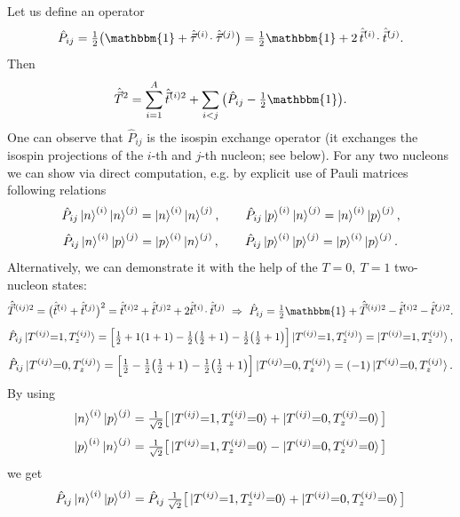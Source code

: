 \documentclass[11pt,a4paper]{article}
\newcommand{\op}[1]{\hat{#1}}
\begin{document}
Let us define an operator 
\[
\op P_{ij}=\tfrac12\big(\mathbbm{1}+\op{\vec\tau}^{(i)}\!\cdot\op{\vec\tau}^{(j)}\big)
=\tfrac12 \mathbbm{1}+2\,\op{\vec t}^{(i)}\!\cdot\op{\vec t}^{(j)}.
\]
Then
\[
\op {\vec T}^2=\sum_{i=1}^A \op{\vec t}^{(i)2}+\sum_{i<j}\big(\op P_{ij}-\tfrac12 \mathbbm{1}\big) .
\]
One can observe that $\op P_{ij}$ is the isospin exchange operator (it exchanges the isospin projections of the $i$-th and $j$-th nucleon; see below).
For any two nucleons we can show via direct computation, e.g. by explicit use of Pauli matrices following relations
\[
\op P_{ij}\ket n^{(i)}\ket n^{(j)}=\ket n^{(i)}\ket n^{(j)},\qquad
\op P_{ij}\ket p^{(i)}\ket n^{(j)}=\ket n^{(i)}\ket p^{(j)},
\]
\[
\op P_{ij}\ket n^{(i)}\ket p^{(j)}=\ket p^{(i)}\ket n^{(j)},\qquad
\op P_{ij}\ket p^{(i)}\ket p^{(j)}=\ket p^{(i)}\ket p^{(j)}.
\]
Alternatively, we can demonstrate it with the help of the $T=0,\ T=1$ two-nucleon states:
\[
\op {\vec T}^{(ij) 2}=\big(\op{\vec t}^{(i)}+\op{\vec t}^{(j)}\big)^2
=\op{\vec t}^{(i)2}+\op{\vec t}^{(j)2}+2\op{\vec t}^{(i)}\!\cdot\op{\vec t}^{(j)}
\ \Rightarrow\
\op P_{ij}=\tfrac12 \mathbbm{1} +\op {\vec T}^{(ij) 2}-\op{\vec t}^{(i)2}-\op{\vec t}^{(j)2} .
\]
\[
\op P_{ij}\ket{T^{(ij)}{=}1 ,T^{(ij)}_z}
=\Big[\tfrac12+1(1+1)-\tfrac12\big(\tfrac12+1\big)-\tfrac12\big(\tfrac12+1\big)\Big]\ket{T^{(ij)}{=}1 , T^{(ij)}_z} 
=\ket{T^{(ij)}{=}1 ,T^{(ij)}_z},
\]
\[
\op P_{ij}\ket{T^{(ij)} {=}0 , T^{(ij)}_z}
=\Big[\tfrac12-\tfrac12\big(\tfrac12+1\big)-\tfrac12\big(\tfrac12+1\big)\Big]\ket{T^{(ij)}{=}0 ,T^{(ij)}_z}
=(-1)\ket{T^{(ij)}{=}0 ,T^{(ij)}_z}.
\]
By using 
\[
\ket n^{(i)}\ket p^{(j)}=\tfrac{1}{\sqrt2}\big[\ket{T^{(ij)}{=}1,T_z^{(ij)}{=}0}+\ket{T^{(ij)}{=}0,T^{(ij)}_z{=}0}\big]
\]
\[
\ket p^{(i)}\ket n^{(j)}=\tfrac{1}{\sqrt2}\big[\ket{T^{(ij)}{=}1,T_z^{(ij)}{=}0}-\ket{T^{(ij)}{=}0,T^{(ij)}_z{=}0}\big]
\]
we get 
\[
\op P_{ij}\ket n^{(i)}\ket p^{(j)}
=\op P_{ij}\,\tfrac{1}{\sqrt2}\big[\ket{T^{(ij)}{=}1,T^{(ij)}_z{=}0}+\ket{T^{(ij)}{=}0,T_z^{(ij)}{=}0}\big]
\]
\end{document}
